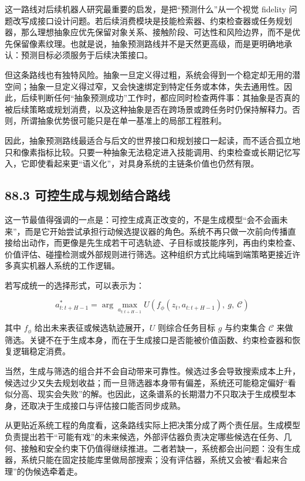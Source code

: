 这一路线对后续机器人研究最重要的启发，是把“预测什么”从一个视觉 fidelity 问题改写成接口设计问题。若后续消费模块是技能检索器、约束检查器或任务规划器，那么理想抽象应优先保留对象关系、接触阶段、可达性和风险边界，而不是优先保留像素纹理。也就是说，抽象预测路线并不是天然更高级，而是更明确地承认：预测目标必须服务于后续决策接口。

但这条路线也有独特风险。抽象一旦定义得过粗，系统会得到一个稳定却无用的潜空间；抽象一旦定义得过窄，又会快速绑定到特定任务或本体，失去通用性。因此，后续判断任何“抽象预测成功”工作时，都应同时检查两件事：其抽象是否真的被后续策略或规划消费，以及这种抽象是否在跨场景或跨任务时仍保持解释力。否则，所谓抽象优势很可能只是在单一基准上的局部工程胜利。

因此，抽象预测路线最适合与后文的世界接口和规划接口一起读，而不适合孤立地只和像素指标比较。只要一种抽象无法稳定进入技能调用、约束检查或长期记忆写入，它即使看起来更“语义化”，对具身系统的主链条价值也仍然有限。

\subsection*{88.3 可控生成与规划结合路线}


这一节最值得强调的一点是：可控生成真正改变的，不是生成模型“会不会画未来”，而是它开始尝试承担行动候选提议器的角色。系统不再只做一次前向传播直接给出动作，而更像是先生成若干可选轨迹、子目标或技能序列，再由约束检查、价值评估、碰撞检测或外部规则进行筛选。这种组织方式比纯端到端策略更接近许多真实机器人系统的工作逻辑。

若写成统一的选择形式，可以表示为：

\begingroup
\scriptsize
\begin{equation*}
a^{*}_{t:t+H-1} =
\arg\max_{a_{t:t+H-1}}
U\!\left(f_{\phi}(z_t, a_{t:t+H-1}),\ g,\ \mathcal{C}\right)
\end{equation*}
\endgroup

其中 \(f_{\phi}\) 给出未来表征或候选轨迹展开，\(U\) 则综合任务目标 \(g\) 与约束集合 \(\mathcal{C}\) 来做筛选。关键不在于生成本身，而在于生成接口是否能被价值函数、约束检查器和恢复逻辑稳定消费。

当然，生成与筛选的组合并不会自动带来可靠性。候选过多会导致搜索成本上升，候选过少又失去规划收益；而一旦筛选器本身带有偏差，系统还可能稳定偏好“看似分高、现实会失败”的解。也因此，这条谱系的长期潜力不只取决于生成模型本身，还取决于生成接口与评估接口能否同步成熟。

从更贴近系统工程的角度看，这条路线实际上把决策分成了两个责任层。生成模型负责提出若干“可能有戏”的未来候选，外部评估器负责决定哪些候选在任务、几何、接触和安全约束下仍值得继续推进。二者若缺一，系统都会出问题：没有生成器，系统只能在固定技能库里做局部搜索；没有评估器，系统又会被“看起来合理”的伪候选牵着走。


